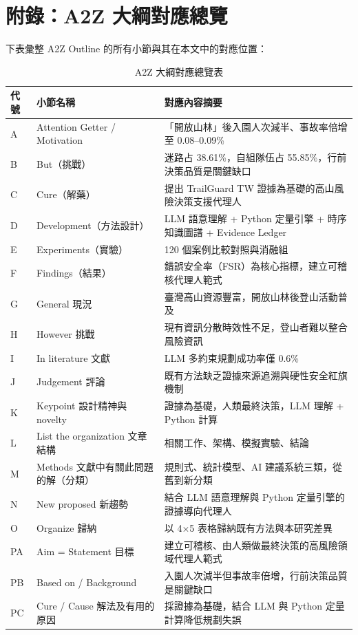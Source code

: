 \documentclass[12pt,a4paper]{article}
\begin{document}
\clearpage
\appendix
\section{附錄：A2Z 大綱對應總覽}
下表彙整 A2Z Outline 的所有小節與其在本文中的對應位置：

\begin{table}[htbp]
\centering
\caption{A2Z 大綱對應總覽表}
\label{tab:a2z-overview}
\begin{tabular}{l|l|p{7cm}}
\toprule
代號 & 小節名稱 & 對應內容摘要 \\
\midrule
A & Attention Getter / Motivation & 「開放山林」後入園人次減半、事故率倍增至 0.08–0.09\% \\
B & But（挑戰） & 迷路占 38.61\%，自組隊伍占 55.85\%，行前決策品質是關鍵缺口 \\
C & Cure（解藥） & 提出 TrailGuard TW 證據為基礎的高山風險決策支援代理人 \\
D & Development（方法設計） & LLM 語意理解 + Python 定量引擎 + 時序知識圖譜 + Evidence Ledger \\
E & Experiments（實驗） & 120 個案例比較對照與消融組 \\
F & Findings（結果） & 錯誤安全率（FSR）為核心指標，建立可稽核代理人範式 \\
G & General 現況 & 臺灣高山資源豐富，開放山林後登山活動普及 \\
H & However 挑戰 & 現有資訊分散時效性不足，登山者難以整合風險資訊 \\
I & In literature 文獻 & LLM 多約束規劃成功率僅 0.6\% \\
J & Judgement 評論 & 既有方法缺乏證據來源追溯與硬性安全紅旗機制 \\
K & Keypoint 設計精神與 novelty & 證據為基礎，人類最終決策，LLM 理解 + Python 計算 \\
L & List the organization 文章結構 & 相關工作、架構、模擬實驗、結論 \\
M & Methods 文獻中有關此問題的解（分類） & 規則式、統計模型、AI 建議系統三類，從舊到新分類 \\
N & New proposed 新趨勢 & 結合 LLM 語意理解與 Python 定量引擎的證據導向代理人 \\
O & Organize 歸納 & 以 4$\times$5 表格歸納既有方法與本研究差異 \\
PA & Aim = Statement 目標 & 建立可稽核、由人類做最終決策的高風險領域代理人範式 \\
PB & Based on / Background & 入園人次減半但事故率倍增，行前決策品質是關鍵缺口 \\
PC & Cure / Cause 解法及有用的原因 & 採證據為基礎，結合 LLM 與 Python 定量計算降低規劃失誤 \\

\end{tabular}
\end{table}
\end{document}
